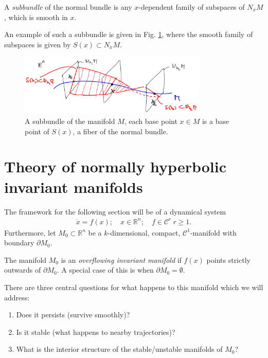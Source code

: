 \begin{definition}
	A \emph{subbundle} of the normal bundle is any $x$-dependent family of subspaces of $N_{x}M$, which is smooth in $x$.
\end{definition}
An example of such a subbundle is given in Fig. \ref{fig:subbundle_ex}, where the smooth family of subspaces is given by $S(x)\subset N_{x}M$.
\begin{figure}[h!]
	\centering
	\includegraphics[width=0.8\textwidth]{figures/ch9/10subbundle_ex.png}
	\caption{A subbundle of the manifold $M$, each base point $x\in M$ is a base point of $S(x)$, a fiber of the normal bundle.}
	\label{fig:subbundle_ex}
\end{figure}

\newpage
\section{Theory of normally hyperbolic invariant manifolds}
The framework for the following section will be of a dynamical system
\begin{align}
	\dot{x}=f(x);\quad x \in \mathbb{R}^{n};\quad f\in\mathcal{C}^{r}\ r\geq 1.
\end{align}
Furthermore, let $M_0\subset \mathbb{R}^{n}$ be a $k$-dimensional, compact, $\mathcal{C}^{1}$-manifold with boundary $\partial M_{0}$.

\begin{definition}
	The manifold $M_0$ is an \emph{overflowing invariant manifold} if $f(x)$ points strictly outwards of $\partial M_0$. A special case of this is when $\partial M_0= \emptyset$.
\end{definition}

There are three central questions for what happens to this manifold which we will address:
\begin{enumerate}
	\item Does it persists (survive smoothly)?
	\item Is it stable (what happens to nearby trajectories)?
	\item What is the interior structure of the stable/unstable manifolds of $M_0$?
\end{enumerate}

